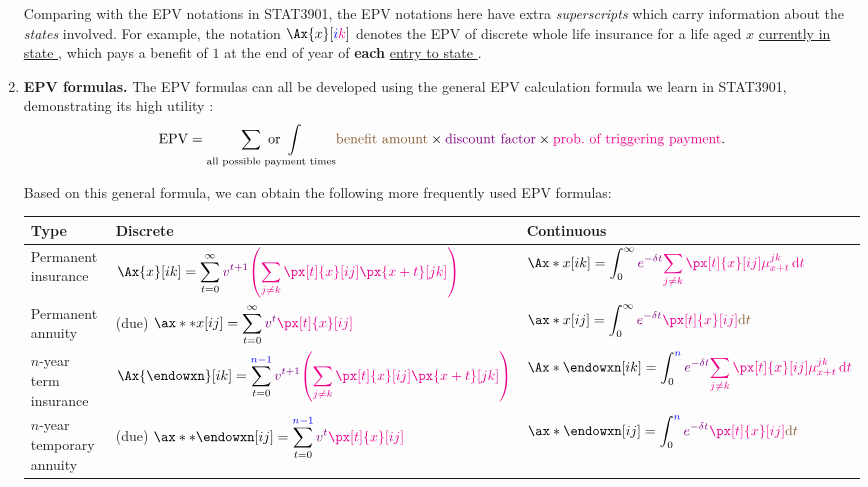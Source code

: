 \begin{enumerate}
Comparing with the EPV notations in STAT3901, the EPV notations here have extra
\emph{superscripts} which carry information about the \emph{states} involved.
For example, the notation \(\Ax{x}[\blc{i}\mgc{k}]\) denotes the EPV of
discrete whole life insurance for a life aged \(x\) \underline{currently in
state }, which pays a benefit of \(1\) at the end of year of
\textbf{each} \underline{entry to state }.

\item \label{it:mult-state-epv-fmlas} \textbf{EPV formulas.} The EPV formulas can all be developed using the
general EPV calculation formula we learn in STAT3901, demonstrating its high
utility :
\[
\text{EPV}=\underset{\text{all possible payment times}}{\sum\text{ or }\int}\brc{\text{benefit amount}}\times\vc{\text{discount factor}}\times\mgc{\text{prob.\ of triggering payment}}.
\]

Based on this general formula, we can obtain the following more frequently used
EPV formulas:
\begin{center}
\begin{tabular}{lll}
\toprule
Type&Discrete&Continuous \\
\midrule
Permanent insurance&
\(\displaystyle \Ax{x}[ik]=\sum_{t=0}^{\infty}\vc{v^{t+1}}\mgc{\qty(\sum_{j\ne k}^{}\px[t]{x}[ij]\px{x+t}[jk])}\)
&\(\displaystyle \Ax*{x}[ik]=\int_{0}^{\infty}\vc{e^{-\delta t}}\mgc{\sum_{j\ne k}^{}\px[t]{x}[ij]\mu_{x+t}^{jk}\dd{t}}\) \\
Permanent annuity&
(due) \(\displaystyle \ax**{x}[ij]=\sum_{t=0}^{\infty}\vc{v^{t}}\mgc{\px[t]{x}[ij]} \)
& \(\displaystyle \ax*{x}[ij]=\int_{0}^{\infty}\vc{e^{-\delta t}}\mgc{\px[t]{x}[ij]}\brc{\dd{t}} \)
\\
\(n\)-year term insurance&
\(\displaystyle \Ax{\endowxn}[ik]
=\sum_{t=0}^{\blc{n-1}}\vc{v^{t+1}}\mgc{\qty(\sum_{j\ne k}^{}\px[t]{x}[ij]\px{x+t}[jk])}\)
&\(\displaystyle \Ax*{\endowxn}[ik]
=\int_{0}^{\blc{n}}\vc{e^{-\delta t}}\mgc{\sum_{j\ne k}^{}\px[t]{x}[ij]\mu_{x+t}^{jk}\dd{t}}\) \\
\(n\)-year temporary annuity&
(due) \(\displaystyle \ax**{\endowxn}[ij]=\sum_{t=0}^{\blc{n-1}}\vc{v^{t}}\mgc{\px[t]{x}[ij]}\)
& \(\displaystyle \ax*{\endowxn}[ij]=\int_{0}^{\blc{n}}\vc{e^{-\delta t}}\mgc{\px[t]{x}[ij]}\brc{\dd{t}} \)
\\
\bottomrule
\end{tabular}
\end{center}
\end{enumerate}
